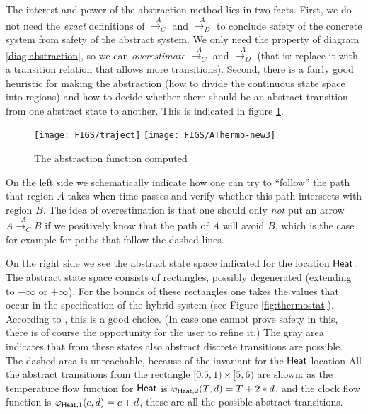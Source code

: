 \documentclass[runningheads]{llncs}
\def\phi{\varphi}
\newcommand{\Heat}{{\sf Heat}}
\newcommand{\acontrans}{\stackrel{A}{\rightarrow_C}}
\newcommand{\adistrans}{\stackrel{A}{\rightarrow_D}}
\begin{document}
The interest and power of the abstraction method lies in two
facts. First, we do not need the {\em exact\/} definitions of
$\acontrans$ and $\adistrans$ to conclude safety of the concrete
system from safety of the abstract system. We only need the property
of diagram \ref{diag:abstraction}, so we can {\em overestimate\/}
$\acontrans$ and $\adistrans$ (that is: replace it with a transition
relation that allows more transitions). Second, there is a fairly good
heuristic for making the abstraction (how to divide the continuous
state space into regions) and how to decide whether there should be an
abstract transition from one abstract state to another.
This is indicated in figure \ref{fig:abstraction}.

\begin{center}
\begin{figure}[htb!]
    \texttt{[image: FIGS/traject]}
    \texttt{[image: FIGS/AThermo-new3]}
\caption{The abstraction function computed
\label{fig:abstraction}}
\end{figure}
\end{center}

On the left side we schematically indicate how one can try to
``follow'' the path that region $A$ takes when time passes and verify
whether this path intersects with region $B$. The idea of
overestimation is that one should only {\em not\/} put an arrow $A
\acontrans B$ if we positively know that the path of $A$ will avoid
$B$, which is the case for example for paths that follow the dashed lines.

On the right side we see the abstract state space indicated for the
location $\Heat$. The abstract state space consists of rectangles,
possibly degenerated (extending to $-\infty$ or $+\infty$). For the
bounds of these rectangles one takes the values that occur in the
specification of the hybrid system (see Figure
\ref{fig:thermostat}). According to \cite{alur}, this is a good
choice. (In case one cannot prove safety in this, there is of course
the opportunity for the user to refine it.)  The gray area indicates
that from these states also abstract discrete transitions are
possible. The dashed area is unreachable, because of the invariant for
the $\Heat$ location %
All the abstract
transitions from the rectangle $[0.5,1) \times[5,6)$ are shown: as the
    temperature flow function for $\Heat$ is $\phi_{\Heat,2}(T,d)= T +
    2 * d$, and the clock flow function is $\phi_{\Heat,1}(c,d) = c +
    d$, these are all the possible abstract transitions.
\end{document}
